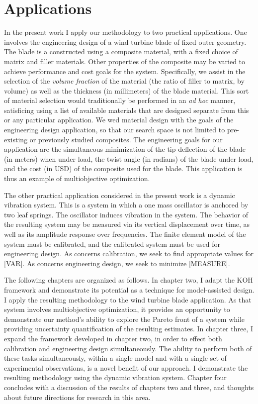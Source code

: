 \documentclass[10pt,a4paper]{article}
\begin{document}
\section{Applications}

In the present work I apply our methodology to two practical applications.
One involves the engineering design of a wind turbine blade of fixed outer geometry.
The blade is a constructed using a composite material, with a fixed choice of matrix and filler materials.
Other properties of the composite may be varied to achieve performance and cost goals for the system.
Specifically, we assist in the selection of the \textit{volume fraction} of the material (the ratio of filler to matrix, by volume) as well as the thickness (in millimeters) of the blade material.
This sort of material selection would traditionally be performed in an \textit{ad hoc} manner, satisficing using a list of available materials that are designed separate from this or any particular application.
We wed material design with the goals of the engineering design application, so that our search space is not limited to pre-existing or previously studied composites.
The engineering goals for our application are the simultaneous minimization of the tip deflection of the blade (in meters) when under load, the twist angle (in radians) of the blade under load, and the cost (in USD) of the composite used for the blade.
This application is thus an example of multiobjective optimization. 

The other practical application considered in the present work is a dynamic vibration system.
This is a system in which a one mass oscillator is anchored by two leaf springs.
The oscillator induces vibration in the system.
The behavior of the resulting system may be measured via its vertical displacement over time, as well as its amplitude response over frequencies.
The finite element model of the system must be calibrated, and the calibrated system must be used for engineering design.
As concerns calibration, we seek to find appropriate values for [VAR].
As concerns engineering design, we seek to minimize [MEASURE].

The following chapters are organized as follows.
In chapter two, I adapt the KOH framework and demonstrate its potential as a technique for model-assisted design.
I apply the resulting methodology to the wind turbine blade application.
As that system involves multiobjective optimization, it provides an opportunity to demonstrate our method's ability to explore the Pareto front of a system while providing uncertainty quantification of the resulting estimates.
In chapter three, I expand the framework developed in chapter two, in order to effect both calibration and engineering design simultaneously.
The ability to perform both of these tasks simultaneously, within a single model and with a single set of experimental observations, is a novel benefit of our approach.
I demonstrate the resulting methodology using the dynamic vibration system.
Chapter four concludes with a discussion of the results of chapters two and three, and thoughts about future directions for research in this area.




	
\end{document}
